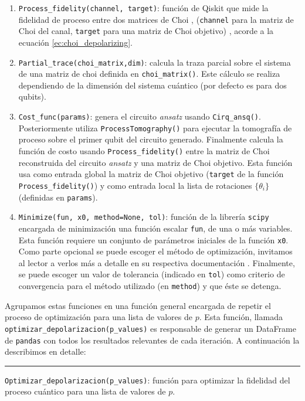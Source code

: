 \documentclass[letterpaper,12pt]{thesisECFM}
\theoremstyle{plain}
\theoremstyle{definition}
\theoremstyle{definition}
\theoremstyle{remark}
\newcommand{\1}{\mathbb{1}}
\begin{document}
\begin{enumerate}
    \item \texttt{Process\_fidelity(channel, target)}: función de Qiskit que
mide la fidelidad de proceso entre dos matrices de Choi , (\texttt{channel}
para la matriz de Choi del canal, \texttt{target} para una matriz de Choi
objetivo) \cite{Qiskit_documentation}, acorde a la ecuación
\ref{ec:choi_depolarizing}.
    \item \texttt{Partial\_trace(choi\_matrix,dim)}: calcula la traza parcial
sobre el sistema de una matriz de choi definida en \texttt{choi\_matrix()}.
Este cálculo se realiza dependiendo de la dimensión del sistema cuántico (por
defecto es para dos qubits).
    \item \texttt{Cost\_func(params)}: genera el circuito \textit{ansatz} usando
\texttt{Cirq\_ansq()}. Posteriormente utiliza \texttt{ProcessTomography()} para
ejecutar la tomografía de proceso sobre el primer qubit del circuito generado.
Finalmente calcula la función de costo usando \texttt{Process\_fidelity()}
entre la matriz de Choi reconstruida del circuito \textit{ansatz} y una matriz de Choi
objetivo. Esta función usa como entrada global la matriz de Choi objetivo
(\texttt{target} de la función \texttt{Process\_fidelity()}) y como entrada
local la lista de rotaciones $\{\theta_i\}$ (definidas en  \texttt{params}).
    \item \texttt{Minimize(fun, x0, method=None, tol)}: función de la librería
\texttt{scipy} encargada de minimización una función escalar \texttt{fun}, de
una o más variables. Esta función requiere un conjunto de parámetros iniciales
de la función \texttt{x0}. Como parte opcional se puede escoger el método de
optimización, invitamos al lector a verlos más a detalle en su respectiva
documentación \cite{scipy}. Finalmente, se puede escoger un valor de tolerancia
(indicado en \texttt{tol})  como criterio de convergencia para el método
utilizado (en \texttt{method}) y que éste se detenga.
\end{enumerate}

Agrupamos estas funciones en una función general encargada de repetir el
proceso de optimización para una lista de valores de $p$. Esta función, llamada
\texttt{optimizar\_depolarizacion(p\_values)} es responsable de generar un
DataFrame de \texttt{pandas} con todos los resultados relevantes de cada
iteración. A continuación la describimos en detalle:

\noindent\rule{\textwidth}{1mm}
\texttt{Optimizar\_depolarizacion(p\_values)}: función para optimizar la
fidelidad del proceso cuántico para una lista de valores de $p$. \newline
\end{document}
